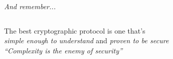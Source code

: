 \documentclass[aspectratio=169, lualatex, handout]{beamer}
\begin{document}
\begin{frame}{\textit{And remember...}}
	\begin{columns}[c]
		\begin{column}{0.5\textwidth}
			\begin{center}
				{\Large The best cryptographic protocol is one that's\\
					\textit{simple enough to understand} and \textit{proven to be secure}} \\
				\vspace{1cm}
				{\small\textit{``Complexity is the enemy of security''}}
			\end{center}
		\end{column}
		\begin{column}{0.5\textwidth}
		\end{column}
	\end{columns}
\end{frame}

\begin{frame}[plain]
	\titlepage
\end{frame}
\end{document}
